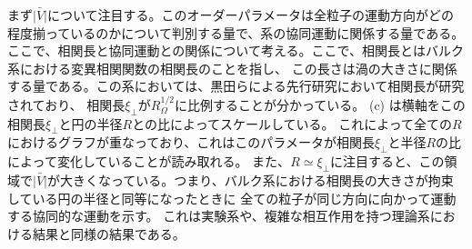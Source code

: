 \documentclass[/Users/ikedahajime/GitHub/reserch/master_report/thesis]{subfiles}
\begin{document}
まず$\bar{|V|}$について注目する。このオーダーパラメータは全粒子の運動方向がどの程度揃っているのかについて判別する量で、系の協同運動に関係する量である。
ここで、相関長と協同運動との関係について考える。ここで、相関長とはバルク系における変異相関関数の相関長のことを指し、
この長さは渦の大きさに関係する量である。この系においては、黒田らによる先行研究において相関長が研究されており\cite{kurodaLongrangeTranslationalOrder2024}、
相関長$\xi_\bot$が$R_\Omega^{1/2}$に比例することが分かっている。
(c) は横軸をこの相関長$\xi_\bot$と円の半径$R$との比によってスケールしている。
これによって全ての$R$におけるグラフが重なっており、これはこのパラメータが相関長$\xi_\bot$と半径$R$の比によって変化していることが読み取れる。
また、$R\simeq \xi_\bot$に注目すると、この領域で$\bar{|V|}$が大きくなっている。つまり、バルク系における相関長の大きさが拘束している円の半径と同等になったときに
全ての粒子が同じ方向に向かって運動する協同的な運動を示す。
これは実験系や、複雑な相互作用を持つ理論系における結果と同様の結果である。%
\end{document}
